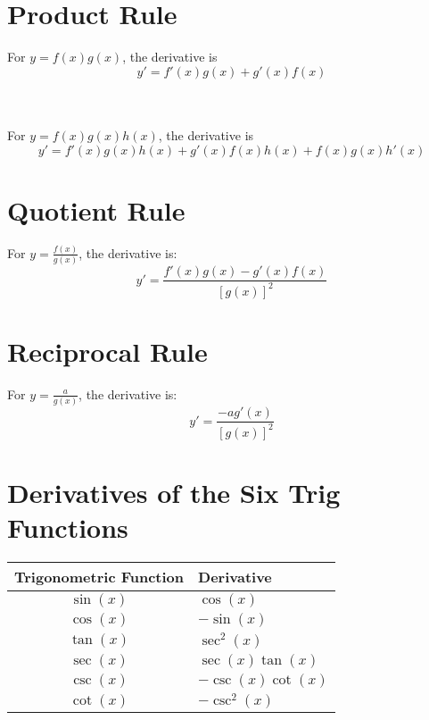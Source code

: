 \section{Product Rule}
\noindent For $y = f(x)g(x)$, the derivative is
\begin{equation*}
  y' = f'(x)g(x) + g'(x)f(x)
\end{equation*}

\noindent \\\\For $y = f(x)g(x)h(x)$, the derivative is
\begin{equation*}
  y' = f'(x)g(x)h(x) + g'(x)f(x)h(x) + f(x)g(x)h'(x)
\end{equation*}


\section{Quotient Rule}
\noindent For $y = \frac{f(x)}{g(x)}$, the derivative is:\\

\begin{equation*}
  y' = \frac{f'(x)g(x)-g'(x)f(x)}{[g(x)]^2}
\end{equation*}


\section{Reciprocal Rule}
\noindent For $y = \frac{a}{g(x)}$, the derivative is:\\

\begin{equation*}
  y' = \frac{-ag'(x)}{[g(x)]^2}
\end{equation*}


\section{Derivatives of the Six Trig Functions}

  \begin{center}
    \begin{tabular}{ |c|l| } 
     \hline
     \textbf{Trigonometric Function} & \textbf{Derivative} \\ 
     \hline
     $\sin(x)$ & $\cos(x)$ \\ 
     \hline
     $\cos(x)$ & $-\sin(x)$ \\ 
     \hline
     $\tan(x)$ & $\sec^2(x)$ \\ 
     \hline
     $\sec(x)$ & $\sec(x)\tan(x)$ \\ 
     \hline
     $\csc(x)$ & $-\csc(x)\cot(x)$ \\ 
     \hline
     $\cot(x)$ & $-\csc^2(x)$ \\ 
     \hline
    \end{tabular}
    \end{center}


